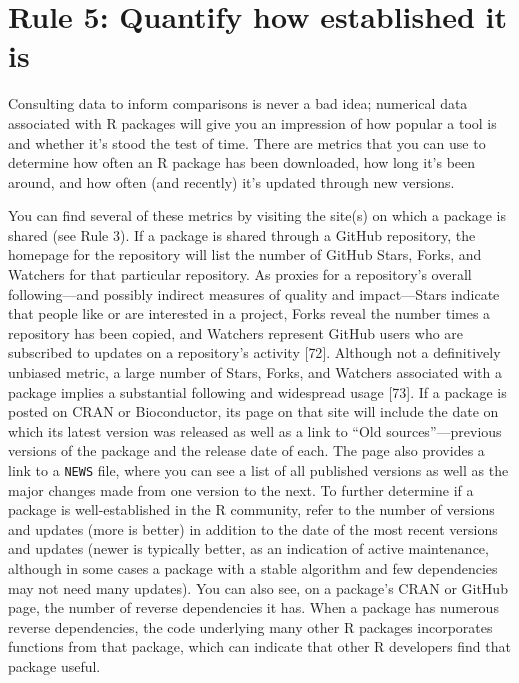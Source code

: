 \documentclass[10pt,letterpaper]{article}
\begin{document}
\hypertarget{rule-5-quantify-how-established-it-is}{%
\section{Rule 5: Quantify how established it
is}\label{rule-5-quantify-how-established-it-is}}

Consulting data to inform comparisons is never a bad idea; numerical
data associated with R packages will give you an impression of how
popular a tool is and whether it's stood the test of time. There are
metrics that you can use to determine how often an R package has been
downloaded, how long it's been around, and how often (and recently) it's
updated through new versions.

You can find several of these metrics by visiting the site(s) on which a
package is shared (see Rule 3). If a package is shared through a GitHub
repository, the homepage for the repository will list the number of
GitHub Stars, Forks, and Watchers for that particular repository. As
proxies for a repository's overall following---and possibly indirect
measures of quality and impact---Stars indicate that people like or are
interested in a project, Forks reveal the number times a repository has
been copied, and Watchers represent GitHub users who are subscribed to
updates on a repository's activity {[}72{]}. Although not a definitively
unbiased metric, a large number of Stars, Forks, and Watchers associated
with a package implies a substantial following and widespread usage
{[}73{]}. If a package is posted on CRAN or Bioconductor, its page on
that site will include the date on which its latest version was released
as well as a link to ``Old sources''---previous versions of the package
and the release date of each. The page also provides a link to a
\texttt{NEWS} file, where you can see a list of all published versions
as well as the major changes made from one version to the next. To
further determine if a package is well-established in the R community,
refer to the number of versions and updates (more is better) in addition
to the date of the most recent versions and updates (newer is typically
better, as an indication of active maintenance, although in some cases a
package with a stable algorithm and few dependencies may not need many
updates). You can also see, on a package's CRAN or GitHub page, the
number of reverse dependencies it has. When a package has numerous
reverse dependencies, the code underlying many other R packages
incorporates functions from that package, which can indicate that other
R developers find that package useful.
\end{document}
